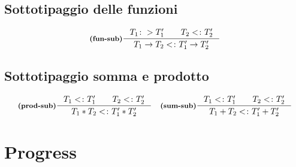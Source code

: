 \documentclass[a4paper, 10pt]{article}
\theoremstyle{definition}
\newcommand{\infer}[4]{\inference[\textbf{#1}]{#2}{#3}#4 }
\begin{document}
\begin{minipage}{.45\linewidth}
\begin{flushleft}
\subsection*{Sottotipaggio delle funzioni}
			\[
				\infer{(fun-sub)}{T_1\colon> T_1'\qquad T_2<\colon T_2'}{T_1\rightarrow T_2 <\colon T_1'\rightarrow T_2'}{}
			\]
\subsection*{Sottotipaggio somma e prodotto}
	\begin{align*}
		&\infer{(prod-sub)}{T_1<\colon T_1'\qquad T_2<\colon T_2'}{T_1 \ast T_2 <\colon T_1'\ast T_2'}{} 
		&\infer{(sum-sub)}{T_1<\colon T_1'\qquad T_2<\colon T_2'}{T_1 + T_2 <\colon T_1'+ T_2'}{}
	\end{align*}
	\end{flushleft}
\end{minipage}	

\newpage


\section*{Progress}
\end{document}
